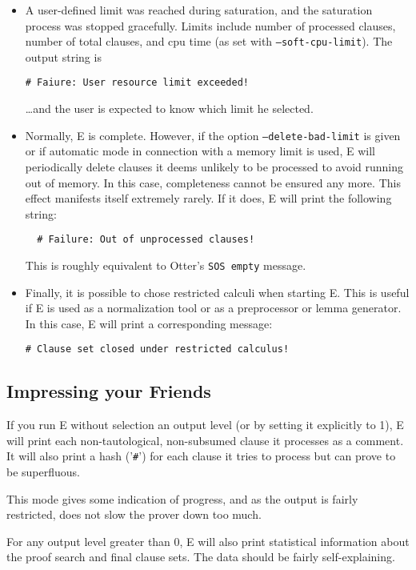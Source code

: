 \documentclass{article}
\begin{document}
\begin{itemize}
\begin{verbatim}
\end{verbatim}
\item A user-defined limit was reached during saturation, and the
  saturation process was stopped gracefully. Limits include number of
  processed clauses, number of total clauses, and cpu time (as set
  with \texttt{--soft-cpu-limit}). The output string is
\begin{verbatim}
# Faiure: User resource limit exceeded!
\end{verbatim}
  \ldots and the user is expected to know which limit he selected.
\item Normally, E is complete. However, if the option
  \texttt{--delete-bad-limit} is given or if automatic mode in
  connection with a memory limit is used, E will periodically delete
  clauses it deems unlikely to be processed to avoid running out of
  memory. In this case, completeness cannot be ensured any more. This
  effect manifests itself extremely rarely. If it does, E will print
  the following string:
\begin{verbatim}
  # Failure: Out of unprocessed clauses!
\end{verbatim}
  This is roughly equivalent to Otter's \texttt{SOS empty} message.
\item Finally, it is possible to chose restricted calculi when
  starting E. This is useful if E is used as a normalization tool or
  as a preprocessor or lemma generator. In this case, E will print a
  corresponding message:
\begin{verbatim}
# Clause set closed under restricted calculus!
\end{verbatim}
\end{itemize}


\subsection{Impressing your Friends}
\label{sec:output:normal}

If you run E without selection an output level (or by setting it
explicitly to 1), E will print each non-tautological, non-subsumed
clause it processes as a comment. It will also print a hash
('\verb+#+') for each clause it tries to process but can prove to be
superfluous.

This mode gives some indication of progress, and as the output is
fairly restricted, does not slow the prover down too much.

For any output level greater than 0, E will also print statistical
information about the proof search and final clause sets. The data
should be fairly self-explaining.
\end{document}

